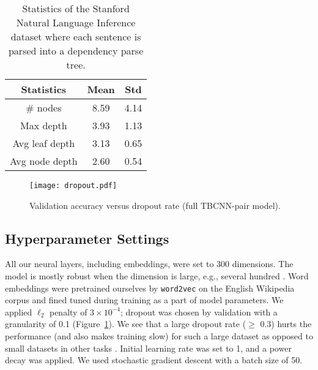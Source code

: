 \documentclass[11pt]{article}
\begin{document}
\begin{table}[!t]
\centering
\begin{tabular}{|ccc|}
\hline
\textbf{Statistics} & \textbf{Mean} &\textbf{Std}\\
\hline\hline
\# nodes   & 8.59 & 4.14\\
Max depth & 3.93 & 1.13\\
Avg leaf depth & 3.13 & 0.65\\
Avg node depth & 2.60 & 0.54\\
\hline
\end{tabular}
\caption{Statistics of the Stanford Natural Language Inference dataset where each sentence is parsed into a dependency parse tree.}\label{tab:statistics}
\end{table}
\begin{figure}[!t]
\centering
\texttt{[image: dropout.pdf]}
\vspace{-.3cm}
\caption{Validation accuracy versus dropout rate (full TBCNN-pair model).}\label{fig:dropout}
\end{figure}




\subsection{Hyperparameter Settings}\label{ss:hyperparameters}

All our neural layers, including embeddings, were set to 300 dimensions. The model is mostly robust when the dimension is large, e.g., several hundred \cite{unified}. Word embeddings were pretrained ourselves by {\tt word2vec} on the English Wikipedia corpus and fined tuned during training as a part of model parameters.  We applied $\ell_2$ penalty of $3\times10^{-4}$; dropout was chosen by validation with a granularity of 0.1 (Figure~\ref{fig:dropout}). We see that a large dropout rate ($\ge$ 0.3) hurts the performance (and also makes training slow) for such a large dataset as opposed to small datasets in other tasks \cite{regularization}. Initial learning rate was set to 1, and a power decay was applied. We used stochastic gradient descent with a batch size of 50.
\end{document}
